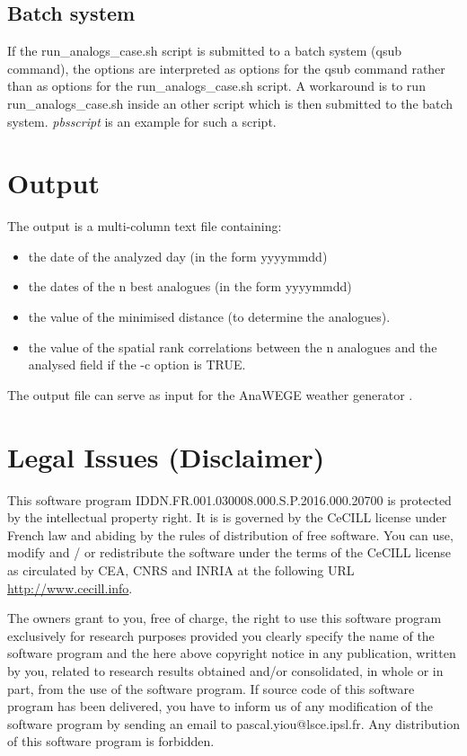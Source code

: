 \documentclass[11p,a4paper]{article}
\begin{document}
\subsection{Batch system}
\label{sec:batchmode}
If the run\_analogs\_case.sh script is submitted to a batch system (qsub command), the options are interpreted as options for the qsub command rather than as options for the run\_analogs\_case.sh script. A workaround is to run run\_analogs\_case.sh inside an other script which is then submitted to the batch system. \textit{pbsscript} is an example for such a script.

\section{Output}
The output is a multi-column text file containing:
\begin{itemize}
 \item the date of the analyzed day (in the form yyyymmdd)
 \item the dates of the n best analogues (in the form yyyymmdd)
 \item the value of the minimised distance (to determine the analogues). 
 \item the value of the spatial rank correlations between the n analogues and the analysed field if the -c option is TRUE.
\end{itemize}

The output file can serve as input for the AnaWEGE weather generator \citep{yiou14a}.

\section{Legal Issues (Disclaimer)}
This software program IDDN.FR.001.030008.000.S.P.2016.000.20700 is protected by the intellectual property right. 
It is is governed by the CeCILL license under French law and abiding by the rules of distribution 
of free software. You can use, modify and / or redistribute the software under the terms of the 
 CeCILL license as circulated by CEA, CNRS and INRIA at the following URL \href{http://www.cecill.info}{http://www.cecill.info}.
 
The owners grant to you, free of charge, the right to use this software program exclusively for research purposes provided you clearly specify the name of the software program and the here above copyright notice in any publication, written by you, related to research results obtained and/or consolidated, in whole or in part, from the use of the software program. 
If source code of this software program has been delivered, you have to inform us of any modification of the software program by sending an email to pascal.yiou@lsce.ipsl.fr.
Any distribution of this software program is forbidden. 
\end{document}
